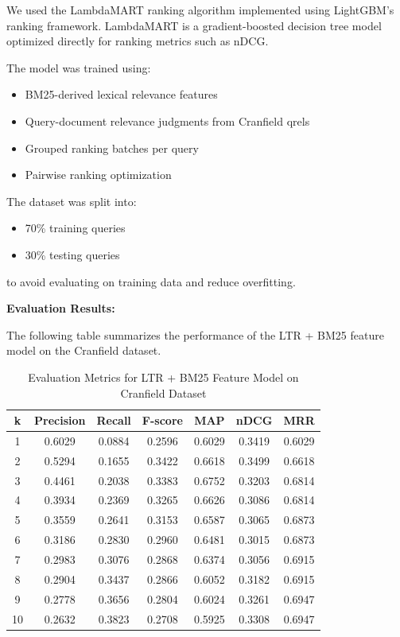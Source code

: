 \documentclass{article}
\begin{document}
We used the LambdaMART ranking algorithm implemented using LightGBM’s ranking framework. LambdaMART is a gradient-boosted decision tree model optimized directly for ranking metrics such as nDCG.

The model was trained using:
\begin{itemize}
    \item BM25-derived lexical relevance features
    \item Query-document relevance judgments from Cranfield qrels
    \item Grouped ranking batches per query
    \item Pairwise ranking optimization
\end{itemize}

The dataset was split into:
\begin{itemize}
    \item 70\% training queries
    \item 30\% testing queries
\end{itemize}

to avoid evaluating on training data and reduce overfitting.

\textbf{Evaluation Results:}

The following table summarizes the performance of the LTR + BM25 feature model on the Cranfield dataset.

\begin{table}[H]
\centering
\begin{tabular}{|c|c|c|c|c|c|c|}
\hline
k & Precision & Recall & F-score & MAP & nDCG & MRR \\
\hline
1 & 0.6029 & 0.0884 & 0.2596 & 0.6029 & 0.3419 & 0.6029 \\
2 & 0.5294 & 0.1655 & 0.3422 & 0.6618 & 0.3499 & 0.6618 \\
3 & 0.4461 & 0.2038 & 0.3383 & 0.6752 & 0.3203 & 0.6814 \\
4 & 0.3934 & 0.2369 & 0.3265 & 0.6626 & 0.3086 & 0.6814 \\
5 & 0.3559 & 0.2641 & 0.3153 & 0.6587 & 0.3065 & 0.6873 \\
6 & 0.3186 & 0.2830 & 0.2960 & 0.6481 & 0.3015 & 0.6873 \\
7 & 0.2983 & 0.3076 & 0.2868 & 0.6374 & 0.3056 & 0.6915 \\
8 & 0.2904 & 0.3437 & 0.2866 & 0.6052 & 0.3182 & 0.6915 \\
9 & 0.2778 & 0.3656 & 0.2804 & 0.6024 & 0.3261 & 0.6947 \\
10 & 0.2632 & 0.3823 & 0.2708 & 0.5925 & 0.3308 & 0.6947 \\
\hline
\end{tabular}
\caption{Evaluation Metrics for LTR + BM25 Feature Model on Cranfield Dataset}
\end{table}
\end{document}
